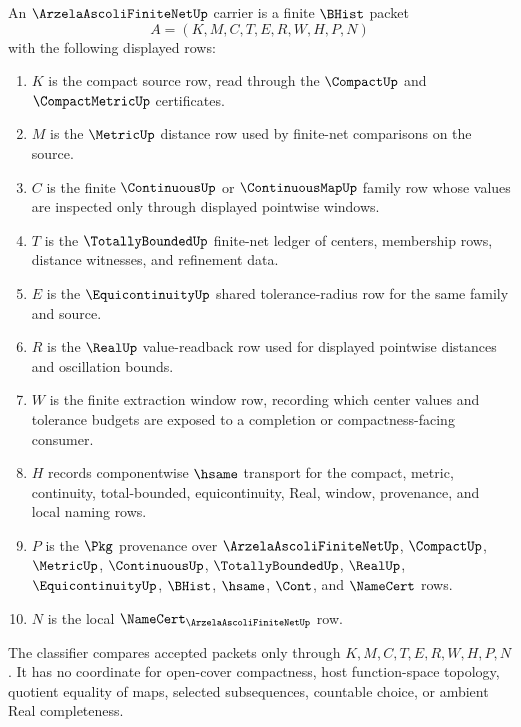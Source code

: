 \begin{definition}
\label{def:arzela-ascoli-finite-net-carrier}
An $\ArzelaAscoliFiniteNetUp$ carrier is a finite $\BHist$ packet
$$
A=(K,M,C,T,E,R,W,H,P,N)
$$
with the following displayed rows:
\begin{enumerate}
\item $K$ is the compact source row, read through the $\CompactUp$ and $\CompactMetricUp$ certificates.
\item $M$ is the $\MetricUp$ distance row used by finite-net comparisons on the source.
\item $C$ is the finite $\ContinuousUp$ or $\ContinuousMapUp$ family row whose values are inspected only through displayed pointwise windows.
\item $T$ is the $\TotallyBoundedUp$ finite-net ledger of centers, membership rows, distance witnesses, and refinement data.
\item $E$ is the $\EquicontinuityUp$ shared tolerance-radius row for the same family and source.
\item $R$ is the $\RealUp$ value-readback row used for displayed pointwise distances and oscillation bounds.
\item $W$ is the finite extraction window row, recording which center values and tolerance budgets are exposed to a completion or compactness-facing consumer.
\item $H$ records componentwise $\hsame$ transport for the compact, metric, continuity, total-bounded, equicontinuity, Real, window, provenance, and local naming rows.
\item $P$ is the $\Pkg$ provenance over $\ArzelaAscoliFiniteNetUp$, $\CompactUp$, $\MetricUp$, $\ContinuousUp$, $\TotallyBoundedUp$, $\RealUp$, $\EquicontinuityUp$, $\BHist$, $\hsame$, $\Cont$, and $\NameCert$ rows.
\item $N$ is the local $\NameCert_{\ArzelaAscoliFiniteNetUp}$ row.
\end{enumerate}
The classifier compares accepted packets only through $K,M,C,T,E,R,W,H,P,N$. It has no coordinate for open-cover compactness, host function-space topology, quotient equality of maps, selected subsequences, countable choice, or ambient Real completeness.
\end{definition}

